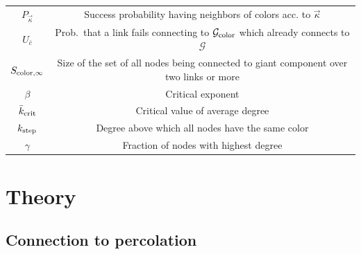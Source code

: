 \documentclass[aps, pre, onecolumn, a4paper, floatfix]{revtex4}
\begin{document}
{\begin{tabular}{ c c }
 $P_{\vec \kappa}$ & Success probability having neighbors of colors acc. to $\vec \kappa$ \\
 $U_{\bar c}$ & Prob.\ that a link fails connecting to ${\mathcal G}_{\rm color}$ which already connects to ${\mathcal G}$ \\
 $S_{{\rm color},\infty}$ & Size of the set of all nodes being connected to giant component over two links or more \\
 \hline
 \hline
 $\beta$ & Critical exponent \\
 ${\bar k}_{\rm crit}$ & Critical value of average degree \\
 $k_{\rm step}$ & Degree above which all nodes have the same color \\
 $\gamma$ & Fraction of nodes with highest degree \\
\end{tabular}

}





\section{Theory}

\subsection{Connection to percolation}
\end{document}
